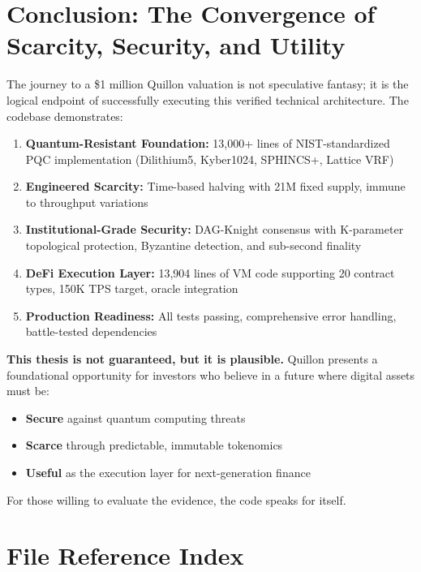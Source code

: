 \documentclass[11pt,a4paper]{article}
\begin{document}
\section{Conclusion: The Convergence of Scarcity, Security, and Utility}

The journey to a \$1 million Quillon valuation is not speculative fantasy; it is the logical endpoint of successfully executing this verified technical architecture. The codebase demonstrates:

\begin{enumerate}
    \item \textbf{Quantum-Resistant Foundation:} 13,000+ lines of NIST-standardized PQC implementation (Dilithium5, Kyber1024, SPHINCS+, Lattice VRF)

    \item \textbf{Engineered Scarcity:} Time-based halving with 21M fixed supply, immune to throughput variations

    \item \textbf{Institutional-Grade Security:} DAG-Knight consensus with K-parameter topological protection, Byzantine detection, and sub-second finality

    \item \textbf{DeFi Execution Layer:} 13,904 lines of VM code supporting 20 contract types, 150K TPS target, oracle integration

    \item \textbf{Production Readiness:} All tests passing, comprehensive error handling, battle-tested dependencies
\end{enumerate}

\textbf{This thesis is not guaranteed, but it is plausible.} Quillon presents a foundational opportunity for investors who believe in a future where digital assets must be:
\begin{itemize}
    \item \textbf{Secure} against quantum computing threats
    \item \textbf{Scarce} through predictable, immutable tokenomics
    \item \textbf{Useful} as the execution layer for next-generation finance
\end{itemize}

For those willing to evaluate the evidence, the code speaks for itself.

\appendix

\section{File Reference Index}
\end{document}
